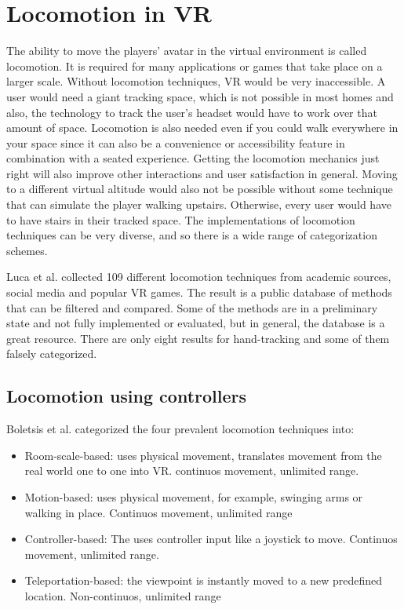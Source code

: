 \section{Locomotion in VR}\label{locomotion-in-vr}
The ability to move the players' avatar in the virtual environment is
called locomotion. It is required for many applications or games that
take place on a larger scale. Without locomotion techniques, VR would be
very inaccessible. A user would need a giant tracking space, which is
not possible in most homes and also, the technology to track the user's
headset would have to work over that amount of space. Locomotion is also
needed even if you could walk everywhere in your space since it can
also be a convenience or accessibility feature in combination with a
seated experience. Getting the locomotion mechanics just right will
also improve other interactions and user satisfaction in general. Moving
to a different virtual altitude would also not be possible without some
technique that can simulate the player walking upstairs. Otherwise,
every user would have to have stairs in their tracked space. The
implementations of locomotion techniques can be very diverse, and so there
is a wide range of categorization schemes.

Luca et al. \cite{Luca} collected 109 different locomotion techniques from academic
sources, social media and popular VR games. The result is a public
database of methods that can be filtered and compared. Some of the
methods are in a preliminary state and not fully implemented or
evaluated, but in general, the database is a great resource. There are only eight results for hand-tracking
and some of them falsely categorized.

\subsection{Locomotion using controllers}\label{locomotion-using-controllers}

Boletsis et al. \cite{Boletsis} categorized the four
prevalent locomotion techniques into:

\begin{itemize}
\itemsep1pt\parskip0pt
\item
  Room-scale-based: uses physical movement, translates movement from the
  real world one to one into VR. continuos movement, unlimited range.\\
\item
  Motion-based: uses physical movement, for example, swinging arms or
  walking in place. Continuos movement, unlimited range\\
\item
  Controller-based: The uses controller input like a joystick to move.
  Continuos movement, unlimited range.\\
\item
  Teleportation-based: the viewpoint is instantly moved to a new
  predefined location. Non-continuos, unlimited range
\end{itemize}

